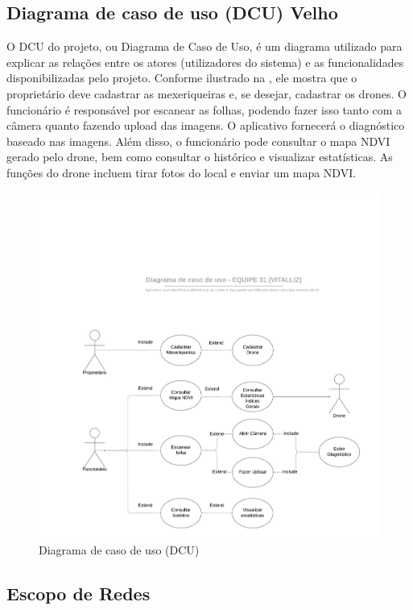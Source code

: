 \documentclass[
    a4paper,%
    12pt,%
    english,%
    brazilian,%
]{article}
\begin{document}
\subsection*{\textbf{Diagrama de caso de uso (DCU) Velho}}

O DCU do projeto, ou Diagrama de Caso de Uso, é um diagrama utilizado para explicar as relações entre os atores (utilizadores do sistema) e as funcionalidades disponibilizadas pelo projeto. Conforme ilustrado na , ele mostra que o proprietário deve cadastrar as mexeriqueiras e, se desejar, cadastrar os drones. O funcionário é responsável por escanear as folhas, podendo fazer isso tanto com a câmera quanto fazendo upload das imagens. O aplicativo fornecerá o diagnóstico baseado nas imagens. Além disso, o funcionário pode consultar o mapa NDVI gerado pelo drone, bem como consultar o histórico e visualizar estatísticas. As funções do drone incluem tirar fotos do local e enviar um mapa NDVI.



\begin{figure}[H]
\centering
\caption{Diagrama de caso de uso (DCU)}%
\label{fig:dcu}
\includegraphics[width=0.8\linewidth]{Logos/dcu.jpeg}
\end{figure}

\subsection*{\textbf{Escopo de Redes}}
\end{document}
